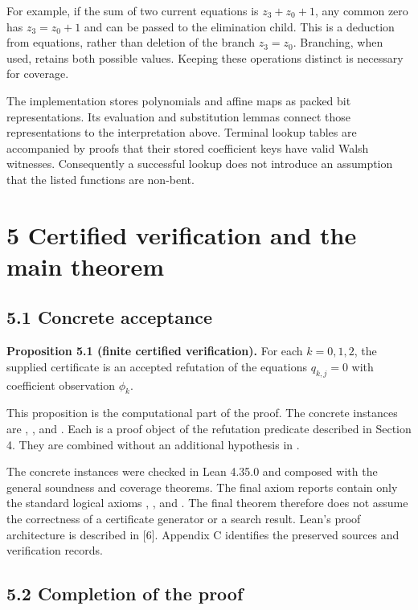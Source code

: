 \documentclass[11pt,a4paper]{article}
\begin{document}
For example, if the sum of two current equations is $z_3+z_0+1$, any common zero has $z_3=z_0+1$ and can be passed to the elimination child. This is a deduction from equations, rather than deletion of the branch $z_3=z_0$. Branching, when used, retains both possible values. Keeping these operations distinct is necessary for coverage.

The implementation stores polynomials and affine maps as packed bit representations. Its evaluation and substitution lemmas connect those representations to the interpretation above. Terminal lookup tables are accompanied by proofs that their stored coefficient keys have valid Walsh witnesses. Consequently a successful lookup does not introduce an assumption that the listed functions are non-bent.

\section*{5 Certified verification and the main theorem}

\subsection*{5.1 Concrete acceptance}

\textbf{Proposition 5.1 (finite certified verification).} For each $k=0,1,2$, the supplied certificate is an accepted refutation of the equations $q_{k,j}=0$ with coefficient observation $\phi_k$.

This proposition is the computational part of the proof. The concrete instances are , , and . Each is a proof object of the refutation predicate described in Section 4. They are combined without an additional hypothesis in .

The concrete instances were checked in Lean 4.35.0 and composed with the general soundness and coverage theorems. The final axiom reports contain only the standard logical axioms , , and . The final theorem therefore does not assume the correctness of a certificate generator or a search result. Lean's proof architecture is described in [6]. Appendix C identifies the preserved sources and verification records.

\subsection*{5.2 Completion of the proof}
\end{document}
